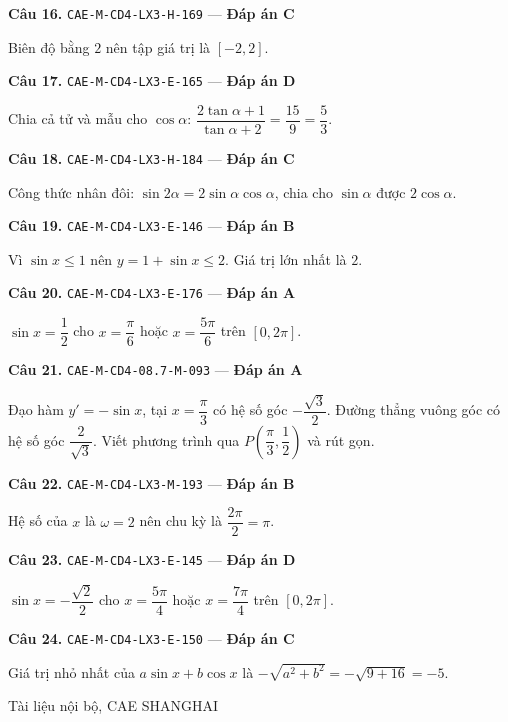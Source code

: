\documentclass[11pt, a4paper]{article}
\begin{document}
\textbf{Câu 16.} \texttt{CAE-M-CD4-LX3-H-169} — \textbf{Đáp án C}

Biên độ bằng $2$ nên tập giá trị là $[-2, 2]$.

\textbf{Câu 17.} \texttt{CAE-M-CD4-LX3-E-165} — \textbf{Đáp án D}

Chia cả tử và mẫu cho $\cos\alpha$: $\dfrac{2\tan\alpha + 1}{\tan\alpha + 2} = \dfrac{15}{9} = \dfrac{5}{3}$.

\textbf{Câu 18.} \texttt{CAE-M-CD4-LX3-H-184} — \textbf{Đáp án C}

Công thức nhân đôi: $\sin 2\alpha = 2\sin\alpha\cos\alpha$, chia cho $\sin\alpha$ được $2\cos\alpha$.

\textbf{Câu 19.} \texttt{CAE-M-CD4-LX3-E-146} — \textbf{Đáp án B}

Vì $\sin x \le 1$ nên $y = 1 + \sin x \le 2$. Giá trị lớn nhất là $2$.

\textbf{Câu 20.} \texttt{CAE-M-CD4-LX3-E-176} — \textbf{Đáp án A}

$\sin x = \dfrac{1}{2}$ cho $x = \dfrac{\pi}{6}$ hoặc $x = \dfrac{5\pi}{6}$ trên $[0, 2\pi]$.

\textbf{Câu 21.} \texttt{CAE-M-CD4-08.7-M-093} — \textbf{Đáp án A}

Đạo hàm $y' = -\sin x$, tại $x = \dfrac{\pi}{3}$ có hệ số góc $-\dfrac{\sqrt{3}}{2}$. Đường thẳng vuông góc có hệ số góc $\dfrac{2}{\sqrt{3}}$. Viết phương trình qua $P\left(\dfrac{\pi}{3}, \dfrac{1}{2}\right)$ và rút gọn.

\textbf{Câu 22.} \texttt{CAE-M-CD4-LX3-M-193} — \textbf{Đáp án B}

Hệ số của $x$ là $\omega = 2$ nên chu kỳ là $\dfrac{2\pi}{2} = \pi$.

\textbf{Câu 23.} \texttt{CAE-M-CD4-LX3-E-145} — \textbf{Đáp án D}

$\sin x = -\dfrac{\sqrt{2}}{2}$ cho $x = \dfrac{5\pi}{4}$ hoặc $x = \dfrac{7\pi}{4}$ trên $[0, 2\pi]$.

\textbf{Câu 24.} \texttt{CAE-M-CD4-LX3-E-150} — \textbf{Đáp án C}

Giá trị nhỏ nhất của $a\sin x + b\cos x$ là $-\sqrt{a^2 + b^2} = -\sqrt{9 + 16} = -5$.
\vspace{0.8cm}
\begin{center}
{\footnotesize\color{cae_blue} Tài liệu nội bộ, CAE SHANGHAI}
\end{center}
\end{document}

